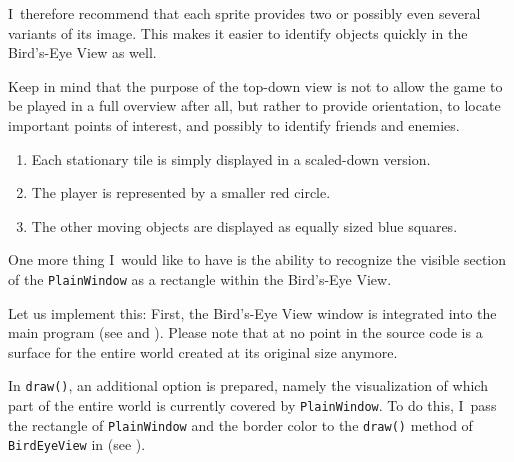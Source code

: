 

I~therefore recommend that each sprite provides two or possibly even several variants of its image. This makes it easier to identify objects quickly in the Bird’s-Eye View as well. 

Keep in mind that the purpose of the top-down view is not to allow the game to be played in a full overview after all, but rather to provide orientation, to locate important points of interest, and possibly to identify friends and enemies.

\begin{enumerate}
	\item Each stationary tile is simply displayed in a scaled-down version.
	\item The player is represented by a smaller red circle.
	\item The other moving objects are displayed as equally sized blue squares.
\end{enumerate}

One more thing I~would like to have is the ability to recognize the visible section of the \texttt{PlainWindow} as a rectangle within the Bird’s-Eye View.

Let us implement this: First, the Bird’s-Eye View window is integrated into the main program (see  and ). Please note that at no point in the source code is a surface for the entire world created at its original size anymore.


In \texttt{draw()}, an additional option is prepared, namely the visualization of which part of the entire world is currently covered by \texttt{PlainWindow}. To do this, I~pass the rectangle of \texttt{PlainWindow} and the border color to the \texttt{draw()} method of \texttt{BirdEyeView} in  (see ).

